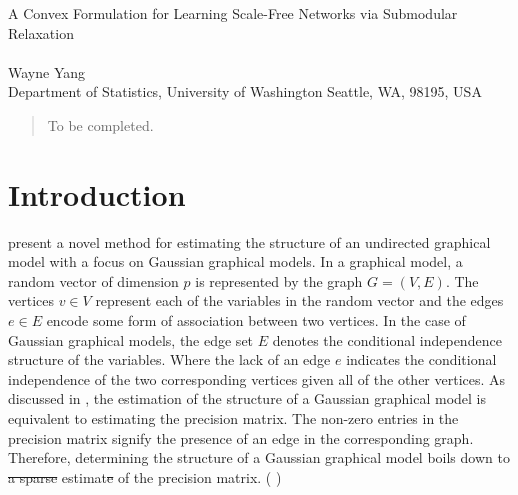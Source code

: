 \documentclass{uwstat572}
\newcommand{\vmdel}[1]{\sout{#1}}
\newcommand{\vmadd}[1]{\textbf{\color{red}{#1}}}
\newcommand{\vmcomment}[1]{({\color{blue}{VM's comment:}} \textbf{\color{blue}{#1}})}
\theoremstyle{remark}
\theoremstyle{definition}
\begin{document}

\begin{center}
  {\LARGE A Convex Formulation for Learning Scale-Free Networks via Submodular Relaxation}\\\ \\
  {Wayne Yang \\ 
    Department of Statistics, University of Washington Seattle, WA, 98195, USA
  }
\end{center}



\begin{abstract}
  To be completed.
\end{abstract}

\section{Introduction}
\citet{Defazio2012} present a novel method for estimating the structure of an undirected graphical model with a focus on Gaussian graphical models. In a graphical model, a random vector of dimension $p$ is represented by the graph $G = (V,E)$.  The vertices $v \in V$ represent each of the variables in the random vector and the edges $e \in E$ encode some form of association between two vertices. In the case of Gaussian graphical models, the edge set $E$ denotes the conditional independence structure of the variables.  Where the lack of an edge $e$ indicates the conditional independence of the two corresponding vertices given all of the other vertices.  As discussed in \cite{dempster}, the estimation of the structure of a Gaussian graphical model is equivalent to estimating the precision matrix.  The non-zero entries in the precision matrix signify the presence of an edge in the corresponding graph.  
Therefore, determining the structure of a Gaussian graphical model boils down to \vmdel{a sparse} 
estimat\vmdel{e}\vmadd{ing the non-zero pattern} of the precision matrix. 
\vmcomment{My change makes the last sentence repetitive, but I didn't like ``sparse," because the estimate is sparse only if there is a lot of zeros, which is not guaranteed in an arbitrary Gaussian graphical model.}
\end{document}
